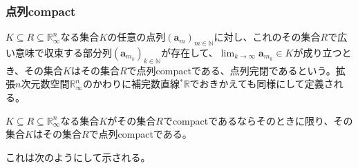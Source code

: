 \documentclass[dvipdfmx]{jsarticle}
\begin{document}
\subsubsection{点列compact}%
\begin{dfn}
$K \subseteq R \subseteq \mathbb{R}_{\infty}^{n}$なる集合$K$の任意の点列$\left( \mathbf{a}_{m} \right)_{m \in \mathbb{N}}$に対し、これのその集合$R$で広い意味で収束する部分列$\left( \mathbf{a}_{m_{k}} \right)_{k \in \mathbb{N}}$が存在して、$\lim_{k \rightarrow \infty}\mathbf{a}_{m_{k}} \in K$が成り立つとき、その集合$K$はその集合$R$で点列compactである、点列完閉であるという。拡張$n$次元数空間$\mathbb{R}_{\infty}^{n}$のかわりに補完数直線${}^{*}\mathbb{R}$でおきかえても同様にして定義される。
\end{dfn}
\begin{thm}\label{4.1.7.3}
$K \subseteq R \subseteq \mathbb{R}_{\infty}^{n}$なる集合$K$がその集合$R$でcompactであるならそのときに限り、その集合$K$はその集合$R$で点列compactである。
\end{thm}\par
これは次のようにして示される。
\end{document}
